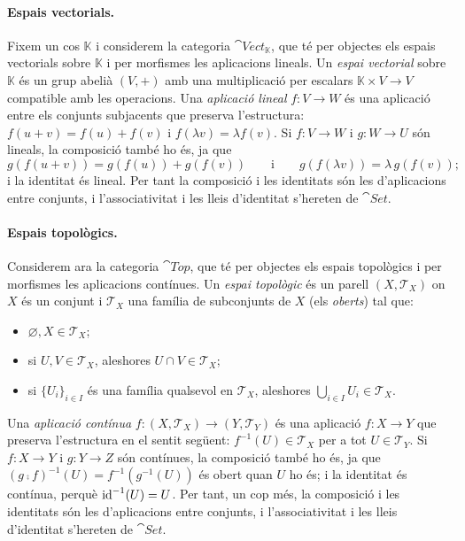 \paragraph{Espais vectorials.}
Fixem un cos $\mathbb{K}$ i considerem la categoria $\cat{Vect}_{\mathbb K}$, que té per objectes els espais vectorials sobre $\mathbb{K}$ i per morfismes les aplicacions lineals. Un \emph{espai vectorial} sobre $\mathbb{K}$ és un grup abelià $(V,+)$ amb una multiplicació per escalars $\mathbb{K}\times V\to V$ compatible amb les operacions. Una \emph{aplicació lineal} $f\colon V\to W$ és una aplicació entre els conjunts subjacents que preserva l'estructura: $f(u+v)=f(u)+f(v)$ i $f(\lambda v)=\lambda f(v)$. Si $f\colon V\to W$ i $g\colon W\to U$ són lineals, la composició també ho és, ja que
\[
g(f(u+v))=g(f(u))+g(f(v))\qquad\text{i}\qquad g(f(\lambda v))=\lambda\,g(f(v));
\]
i la identitat és lineal. Per tant la composició i les identitats són les d'aplicacions entre conjunts, i l'associativitat i les lleis d'identitat s'hereten de $\cat{Set}$.

\paragraph{Espais topològics.}
Considerem ara la categoria $\cat{Top}$, que té per objectes els espais topològics i per morfismes les aplicacions contínues. Un \emph{espai topològic} és un parell $(X,\mathcal{T}_X)$ on $X$ és un conjunt i $\mathcal{T}_X$ una família de subconjunts de $X$ (els \emph{oberts}) tal que:
\begin{itemize}
\item $\varnothing, X\in\mathcal{T}_X$;
\item si $U,V\in\mathcal{T}_X$, aleshores $U\cap V\in\mathcal{T}_X$;
\item si $\{U_i\}_{i\in I}$ és una família qualsevol en $\mathcal{T}_X$, aleshores $\bigcup_{i\in I}U_i\in\mathcal{T}_X$.
\end{itemize}
Una \emph{aplicació contínua} $f\colon(X,\mathcal{T}_X)\to(Y,\mathcal{T}_Y)$ és una aplicació $f\colon X\to Y$ que preserva l'estructura en el sentit següent: $f^{-1}(U)\in\mathcal{T}_X$ per a tot $U\in\mathcal{T}_Y$. Si $f\colon X\to Y$ i $g\colon Y\to Z$ són contínues, la composició també ho és, ja que $(g\comp f)^{-1}(U)=f^{-1}(g^{-1}(U))$ és obert quan $U$ ho és; i la identitat és contínua, perquè $\operatorname{id}^{-1}(U)=U$. Per tant, un cop més, la composició i les identitats són les d'aplicacions entre conjunts, i l'associativitat i les lleis d'identitat s'hereten de $\cat{Set}$.

